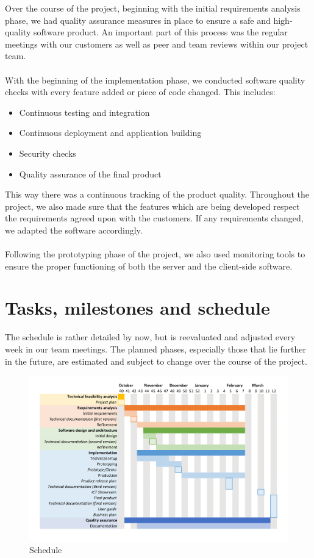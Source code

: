 Over the course of the project, beginning with the initial requirements analysis phase, we had quality assurance measures in place to ensure a safe and high-quality software product. An important part of this process was the regular meetings with our customers as well as peer and team reviews within our project team.
\\\\
With the beginning of the implementation phase, we conducted software quality checks with every feature added or piece of code changed. This includes:

\begin{itemize}
	\item Continuous testing and integration
	\item Continuous deployment and application building
	\item Security checks
	\item Quality assurance of the final product
\end{itemize}

\noindent
This way there was a continuous tracking of the product quality. Throughout the project, we also made sure that the features which are being developed respect the requirements agreed upon with the customers. If any requirements changed, we adapted the software accordingly.
\\\\
Following the prototyping phase of the project, we also used monitoring tools to ensure the proper functioning of both the server and the client-side software.

\section{Tasks, milestones and schedule}\label{sec:schedule}

The schedule is rather detailed by now, but is reevaluated and adjusted every week in our team meetings. The planned phases, especially those that lie further in the future, are estimated and subject to change over the course of the project.

\begin{figure}[ht]
	\centering
	\includegraphics[width=\linewidth]{images/schedule}
	\caption{Schedule}
	\label{fig:schedule}
\end{figure}
